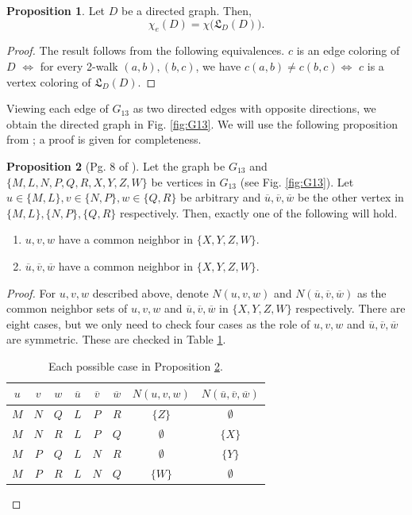 \documentclass[journal, onecolumn, draftcls]{IEEEtran}
\theoremstyle{definition}
\newtheorem{proposition}{Proposition}
\newcommand{\frL}{\mathfrak{L}}
\begin{document}
\begin{proposition}
Let $D$ be a directed graph. Then,
    $$\chi_e(D) = \chi \big (\frL_D(D)\big).
    $$
\end{proposition}
\begin{proof}
The result follows from the following equivalences.
$c$ is an edge coloring of $D$ \newline $\Leftrightarrow$ 
 for every 2-walk $(a,b),(b,c)$, we have $c(a,b)\ne c(b,c)$\newline $\Leftrightarrow$ $c$ is a vertex coloring of $\frL_D(D)$.
\end{proof}
 
Viewing each edge of $G_{13}$ as two directed edges with opposite directions, we obtain the directed graph in Fig. \ref{fig:G13}.  We will use the following proposition from \cite{ManinskaR16}; a proof is given for completeness.
\begin{proposition}[Pg. 8 of \cite{ManinskaR16}]\label{prop:G13_strcture}
    Let the graph be $G_{13}$ and $\{M,L,N,P,Q,R,X,Y,Z,W\}$ be vertices in $G_{13}$ (see Fig. \ref{fig:G13}). Let  $u\in\{M,L\},v\in \{N,P\}, w\in \{Q,R\}$ be arbitrary and $\overline{u},\overline{v},\overline{w}$ be the other vertex in $ \{M,L\},\{N,P\} ,\{Q,R\}$ respectively. 
    Then, exactly one of the following will hold.
    \begin{enumerate}
        \item $u,v,w$ have a common neighbor in $\{X,Y,Z,W\}$.
        \item $\overline{u},\overline{v},\overline{w}$ have a common neighbor in $\{X,Y,Z,W\}$.
    \end{enumerate}  
\end{proposition}
\begin{proof}
For $u,v,w$ described above, denote $N(u,v,w)$ and $N(\overline{u},\overline{v},\overline{w})$ as the common neighbor sets of $u,v,w$ and $\overline{u},\overline{v},\overline{w}$  in $\{X,Y,Z,W\}$ respectively. There are eight cases, but we only need to check four cases as the role of $u,v,w$ and $\overline{u},\overline{v},\overline{w}$ are symmetric.
These are checked in Table \ref{table:check_G13}.  
\begin{table}[t]
\centering
\begin{tabular}{|ccc|ccc|c|c|}
\hline
$u$ & $v$ & $w$ & $\overline{u}$ & $\overline{v}$ & $\overline{w}$ & $N(u,v,w)$ & $N(\overline{u},\overline{v},\overline{w})$ \\ \hline
$M$ & $N$ & $Q$ & $L$ & $P$ & $R$ & $\{Z\}$ & $\emptyset$ \\ \hline
$M$ & $N$ & $R$ & $L$ & $P$ & $Q$ & $\emptyset$ & $\{X\}$ \\ \hline
$M$ & $P$ & $Q$ & $L$ & $N$ & $R$ & $\emptyset$ & $\{Y\}$ \\ \hline
$M$ & $P$ & $R$ & $L$ & $N$ & $Q$ & $\{W\}$ & $\emptyset$ \\ 
\hline
\end{tabular}
\vspace{3mm}
\caption{Each possible case in Proposition \ref{prop:G13_strcture}.}
\label{table:check_G13}
\end{table}
\end{proof}
\end{document}
